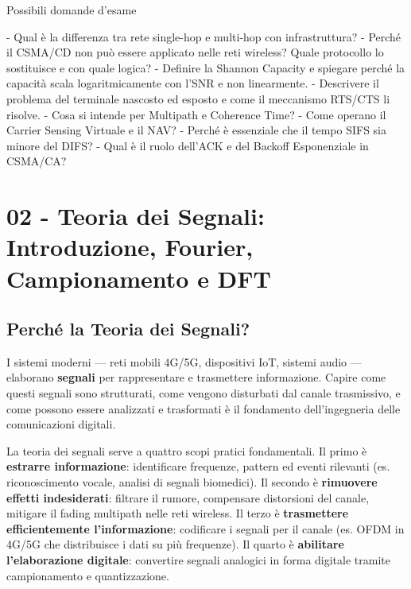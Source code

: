 \documentclass[
  italian,
  openany]{book}
\begin{document}
\begin{calloutquestion}{Possibili domande d’esame}

- Qual è la differenza tra rete single-hop e multi-hop con
infrastruttura? - Perché il CSMA/CD non può essere applicato nelle reti
wireless? Quale protocollo lo sostituisce e con quale logica? - Definire
la Shannon Capacity e spiegare perché la capacità scala logaritmicamente
con l'SNR e non linearmente. - Descrivere il problema del terminale
nascosto ed esposto e come il meccanismo RTS/CTS li risolve. - Cosa si
intende per Multipath e Coherence Time? - Come operano il Carrier
Sensing Virtuale e il NAV? - Perché è essenziale che il tempo SIFS sia
minore del DIFS? - Qual è il ruolo dell'ACK e del Backoff Esponenziale
in CSMA/CA?

\end{calloutquestion}

\newpage

\chapter{02 - Teoria dei Segnali: Introduzione, Fourier, Campionamento e
DFT}\label{teoria-dei-segnali-introduzione-fourier-campionamento-e-dft}

\section{Perché la Teoria dei
Segnali?}\label{perchuxe9-la-teoria-dei-segnali}

I sistemi moderni --- reti mobili 4G/5G, dispositivi IoT, sistemi audio
--- elaborano \textbf{segnali} per rappresentare e trasmettere
informazione. Capire come questi segnali sono strutturati, come vengono
disturbati dal canale trasmissivo, e come possono essere analizzati e
trasformati è il fondamento dell'ingegneria delle comunicazioni
digitali.

La teoria dei segnali serve a quattro scopi pratici fondamentali. Il
primo è \textbf{estrarre informazione}: identificare frequenze, pattern
ed eventi rilevanti (es. riconoscimento vocale, analisi di segnali
biomedici). Il secondo è \textbf{rimuovere effetti indesiderati}:
filtrare il rumore, compensare distorsioni del canale, mitigare il
fading multipath nelle reti wireless. Il terzo è \textbf{trasmettere
efficientemente l'informazione}: codificare i segnali per il canale (es.
OFDM in 4G/5G che distribuisce i dati su più frequenze). Il quarto è
\textbf{abilitare l'elaborazione digitale}: convertire segnali analogici
in forma digitale tramite campionamento e quantizzazione.
\end{document}

